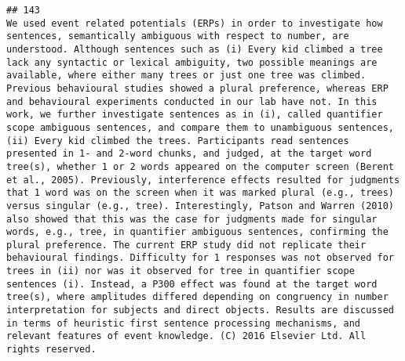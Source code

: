 \documentclass[
  english,
  man]{apa6}
\begin{document}
\begin{verbatim}
## 143                                                                                                                                                                                                                                                                                                                                                                                                                                                                                                                                                                                                                                                                                                                                                                                                                                                                                                       We used event related potentials (ERPs) in order to investigate how sentences, semantically ambiguous with respect to number, are understood. Although sentences such as (i) Every kid climbed a tree lack any syntactic or lexical ambiguity, two possible meanings are available, where either many trees or just one tree was climbed. Previous behavioural studies showed a plural preference, whereas ERP and behavioural experiments conducted in our lab have not. In this work, we further investigate sentences as in (i), called quantifier scope ambiguous sentences, and compare them to unambiguous sentences, (ii) Every kid climbed the trees. Participants read sentences presented in 1- and 2-word chunks, and judged, at the target word tree(s), whether 1 or 2 words appeared on the computer screen (Berent et al., 2005). Previously, interference effects resulted for judgments that 1 word was on the screen when it was marked plural (e.g., trees) versus singular (e.g., tree). Interestingly, Patson and Warren (2010) also showed that this was the case for judgments made for singular words, e.g., tree, in quantifier ambiguous sentences, confirming the plural preference. The current ERP study did not replicate their behavioural findings. Difficulty for 1 responses was not observed for trees in (ii) nor was it observed for tree in quantifier scope sentences (i). Instead, a P300 effect was found at the target word tree(s), where amplitudes differed depending on congruency in number interpretation for subjects and direct objects. Results are discussed in terms of heuristic first sentence processing mechanisms, and relevant features of event knowledge. (C) 2016 Elsevier Ltd. All rights reserved.

\end{verbatim}
\end{document}
